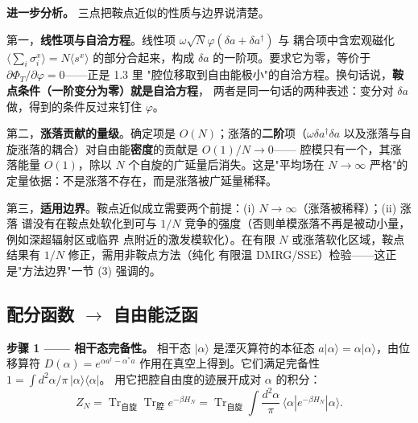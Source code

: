 \documentclass[UTF8,11pt,a4paper]{ctexart}
\begin{document}
\textbf{进一步分析。} 三点把鞍点近似的性质与边界说清楚。

第一，\textbf{线性项与自洽方程}。线性项 $\omega\sqrt N\varphi(\delta a+\delta a^\dagger)$ 与
耦合项中含宏观磁化 $\langle\sum_i\sigma_i^x\rangle=N\langle s^x\rangle$ 的部分合起来，构成
$\delta a$ 的一阶项。要求它为零，等价于 $\partial\Phi_T/\partial\varphi=0$——正是 1.3 里
"腔位移取到自由能极小"的自洽方程。换句话说，\textbf{鞍点条件（一阶变分为零）就是自洽方程}，
两者是同一句话的两种表述：变分对 $\delta a$ 做，得到的条件反过来钉住 $\varphi$。

第二，\textbf{涨落贡献的量级}。确定项是 $O(N)$；涨落的\textbf{二阶}项（$\omega\delta
a^\dagger\delta a$ 以及涨落与自旋涨落的耦合）对自由能\textbf{密度}的贡献是 $O(1)/N\to0$——
腔模只有一个，其涨落能量 $O(1)$，除以 $N$ 个自旋的广延量后消失。这是"平均场在 $N\to\infty$
严格"的定量依据：不是涨落不存在，而是涨落被广延量稀释。

第三，\textbf{适用边界}。鞍点近似成立需要两个前提：(i) $N\to\infty$（涨落被稀释）；(ii) 涨落
谱没有在鞍点处软化到可与 $1/N$ 竞争的强度（否则单模涨落不再是被动小量，例如深超辐射区或临界
点附近的激发模软化）。在有限 $N$ 或涨落软化区域，鞍点结果有 $1/N$ 修正，需用非鞍点方法（纯化
有限温 DMRG/SSE）检验——这正是"方法边界"一节 (3) 强调的。

\subsection{配分函数 $\to$ 自由能泛函}

\textbf{步骤 1 —— 相干态完备性。} 相干态 $|\alpha\rangle$ 是湮灭算符的本征态
$a|\alpha\rangle=\alpha|\alpha\rangle$，由位移算符 $D(\alpha)=e^{\alpha a^\dagger-\alpha^\ast a}$
作用在真空上得到。它们满足完备性 $1=\int d^2\alpha/\pi\,|\alpha\rangle\langle\alpha|$。
用它把腔自由度的迹展开成对 $\alpha$ 的积分：
\[
Z_N=\operatorname{Tr}_{\text{自旋}}\operatorname{Tr}_{\text{腔}}e^{-\beta H_N}
=\operatorname{Tr}_{\text{自旋}}\int\frac{d^2\alpha}{\pi}\,\langle\alpha|e^{-\beta H_N}|\alpha\rangle .
\]
\end{document}
